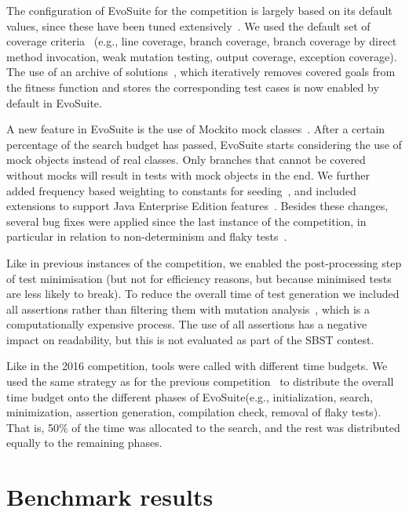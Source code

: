 \documentclass[10pt,conference]{IEEEtran}
\newcommand{\EVOSUITE}{{\sc EvoSuite}\xspace}
\begin{document}
The configuration of \EVOSUITE for the competition is largely based on
its default values, since these have been tuned
extensively~\cite{arcuri2013parameter}. We used the default set of
coverage criteria~\cite{rojas2015combining} (e.g., line coverage,
branch coverage, branch coverage by direct method invocation, weak
mutation testing, output coverage, exception coverage). The use of an
archive of solutions~\cite{emse_archive}, which iteratively removes
covered goals from the fitness function and stores the corresponding
test cases is now enabled by default in \EVOSUITE.

A new feature in \EVOSUITE is the use of Mockito mock
classes~\cite{ICST_Mocking17}. After a certain percentage of the
search budget has passed, \EVOSUITE starts considering the use of mock
objects instead of real classes. Only branches that cannot be covered
without mocks will result in tests with mock objects in the end. We
further added frequency based weighting to constants for
seeding~\cite{sakti2015instance}, and included extensions to support
Java Enterprise Edition features~\cite{arcuri2016java}. Besides these
changes, several bug fixes were applied since the last instance of the
competition, in particular in relation to non-determinism and flaky
tests~\cite{arcuri2014automated}.

Like in previous instances of the competition, we enabled the
post-processing step of test minimisation (but not for efficiency
reasons, but because minimised tests are less likely to break). To
reduce the overall time of test generation we included all assertions
rather than filtering them with mutation
analysis~\cite{10.1109/TSE.2011.93}, which is a computationally
expensive process. The use of all assertions has a negative impact on
readability, but this is not evaluated as part of the SBST contest.

Like in the 2016 competition, tools were called with different time
budgets. We used the same strategy as for the previous
competition~\cite{evosuiteAtSbst2016} to distribute the overall time
budget onto the different phases of \EVOSUITE (e.g., initialization,
search, minimization, assertion generation, compilation check, removal
of flaky tests). That is, 50\% of the time was allocated to the
search, and the rest was distributed equally to the remaining
phases.


\section{Benchmark results}
\end{document}

